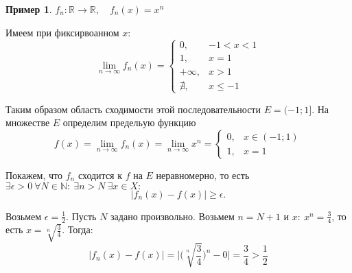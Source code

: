 \documentclass{report}
\theoremstyle{definition}
\newtheorem{example}{Пример}
\begin{document}
\begin{example}
  $f_n: \mathbb{R}\rightarrow\mathbb{R}, \quad f_n(x) = x^n$

  Имеем при фиксирвоанном $x$:
  \begin{equation*}
    \underset{n\rightarrow\infty}{\lim}f_n(x) = \left\{\begin{array}{ll}
      0,        & -1 < x < 1     \\
      1,        & x = 1          \\
      + \infty, & x > 1          \\
      \nexists, & x \leqslant -1
    \end{array}\right.
  \end{equation*}

  Таким образом область сходимости этой последовательности $E = (-1;1]$. На множестве $E$ определим предельую функцию
  \begin{equation*}
    f(x) = \underset{n\rightarrow\infty}{\lim}f_n(x) = \underset{n\rightarrow\infty}{\lim}x^n = \left\{\begin{array}{ll}
      0, & x \in (-1;1) \\
      1, & x = 1
    \end{array}\right.
  \end{equation*}

  Покажем, что $f_n$ сходится к $f$ на $E$ неравномерно, то есть $\exists \epsilon > 0 \ \forall N \in \mathbb{N}: \ \exists n > N \ \exists x \in X:$
  \begin{equation*}
    |f_n(x) - f(x)| \geqslant \epsilon.
  \end{equation*}

  Возьмем $\epsilon = \frac{1}{2}$. Пусть $N$ задано произвольно. Возьмем $n = N + 1$ и $x: \ x^n = \frac{3}{4}$, то есть $x = \sqrt[n]{\frac{3}{4}}$. Тогда:
  \begin{equation*}
    |f_n(x) - f(x)| = \bigg|\bigg(\sqrt[n]{\frac{3}{4}}\bigg)^n - 0\bigg| = \frac{3}{4} > \frac{1}{2}
  \end{equation*}
\end{example}
\end{document}
